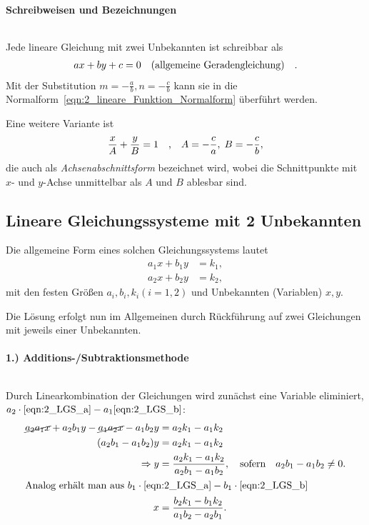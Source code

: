 \paragraph{Schreibweisen und Bezeichnungen}$~$

Jede lineare Gleichung mit zwei Unbekannten ist schreibbar als 
\begin{align}
    a x + b y + c = 0 \qq{(allgemeine Geradengleichung)}.
\end{align}
Mit der Substitution $m = -\frac{a}{b}, n = -\frac{c}{b}$ kann sie in die Normalform~\eqref{eqn:2_lineare_Funktion_Normalform} überführt werden. 

Eine weitere Variante ist 
\begin{align}
    \frac{x}{A} + \frac{y}{B} = 1 \qq{,} A = -\frac{c}{a},\; B = -\frac{c}{b},
\end{align}
die auch als \emph{Achsenabschnittsform} bezeichnet wird, wobei die Schnittpunkte mit $x$- und $y$-Achse unmittelbar als $A$ und $B$ ablesbar sind.

\newpage
\subsection{Lineare Gleichungssysteme mit 2 Unbekannten}

Die allgemeine Form eines solchen Gleichungssystems lautet 
\begin{subequations}
\begin{align}
        a_1 x + b_1 y &= k_1, \label{eqn:2_LGS_a}\\
        a_2 x + b_2 y &= k_2, \label{eqn:2_LGS_b}
    \end{align}
\end{subequations}
mit den festen Größen $a_i, b_i, k_i (i=1,2)$ und Unbekannten (Variablen) $x,y$.

Die Lösung erfolgt nun im Allgemeinen durch Rückführung auf zwei Gleichungen mit jeweils einer Unbekannten. 

\paragraph{1.) Additions-/Subtraktionsmethode}$~$

Durch Linearkombination der Gleichungen wird zunächst eine Variable eliminiert, $a_2 \cdot \eqref{eqn:2_LGS_a} - a_1 \eqref{eqn:2_LGS_b}$: 
\begin{align}
    \cancel{a_2 a_1 x} + a_2 b_1 y - \cancel{a_1a_2 x} - a_1 b_2 y &= a_2 k_1 -a_1 k_2 \notag \\
    (a_2 b_1 -a_1 b_2) y &= a_2 k_1 - a_1 k_2 \notag \\
    \Rightarrow y &= \frac{a_2 k_1 - a_1 k_2}{a_2 b_1 - a_1 b_2}, \qq{sofern} a_2 b_1 - a_1 b_2 \neq 0.\\
\intertext{Analog erhält man aus $b_1\cdot \eqref{eqn:2_LGS_a} - b_1 \cdot \eqref{eqn:2_LGS_b}$}
    x &= \frac{b_2 k_1 - b_1 k_2}{a_1 b_2 -a_2 b_1}.
\end{align}

